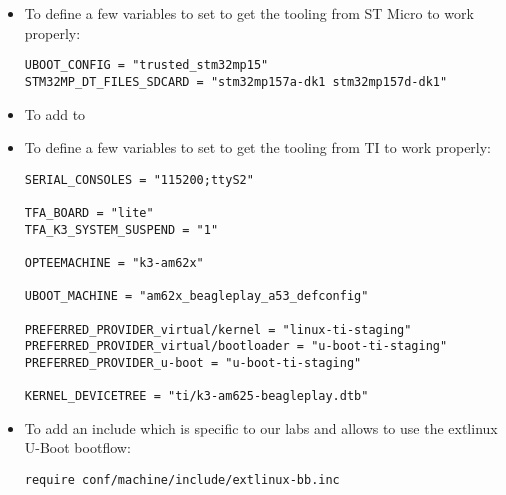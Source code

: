 \if{}
\begin{itemize}
  \item To define a few variables to set to get the tooling from ST
    Micro to work properly:
\begin{verbatim}
UBOOT_CONFIG = "trusted_stm32mp15"
STM32MP_DT_FILES_SDCARD = "stm32mp157a-dk1 stm32mp157d-dk1"
\end{verbatim}
  \item To add  to 
\end{itemize}
\fi

\if{}
\begin{itemize}
  \item To define a few variables to set to get the tooling from TI
   to work properly:
\begin{verbatim}
SERIAL_CONSOLES = "115200;ttyS2"

TFA_BOARD = "lite"
TFA_K3_SYSTEM_SUSPEND = "1"

OPTEEMACHINE = "k3-am62x"

UBOOT_MACHINE = "am62x_beagleplay_a53_defconfig"

PREFERRED_PROVIDER_virtual/kernel = "linux-ti-staging"
PREFERRED_PROVIDER_virtual/bootloader = "u-boot-ti-staging"
PREFERRED_PROVIDER_u-boot = "u-boot-ti-staging"

KERNEL_DEVICETREE = "ti/k3-am625-beagleplay.dtb"
\end{verbatim}
  \item To add an include which is specific to our labs
  and allows to use the extlinux U-Boot bootflow:
\begin{verbatim}
require conf/machine/include/extlinux-bb.inc
\end{verbatim}
\end{itemize}
\fi

